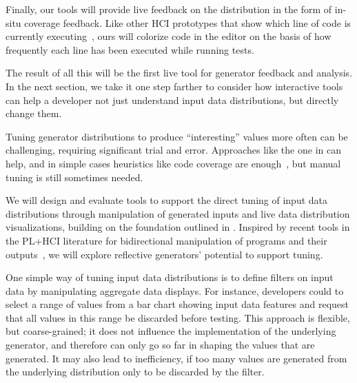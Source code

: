 Finally, our tools will provide live feedback on the
distribution in the form of in-situ coverage feedback. Like other HCI
prototypes that show which line of code is currently
executing~\cite{ref:brandt2010rehearse,
  ref:oney2009firecrystal, ref:burg2013record}, ours will
colorize code in the editor on the basis of
how frequently each line has been executed while running tests.

The result of all this will be the first live tool for generator
feedback and analysis. In the next section, we take it one step
farther to consider how interactive tools can help a developer not
just understand input data distributions, but directly change
them.


%
Tuning generator distributions to produce ``interesting''
values more often can be challenging, requiring
significant trial and error. Approaches
like the one in  can help, and in simple cases
heuristics like code coverage are enough~\cite{afl-readme},
but manual tuning
is still sometimes needed.

We will design and evaluate tools to support the direct tuning of
input data distributions
through manipulation of generated inputs and live data distribution
visualizations, building on the foundation outlined in
. Inspired by recent tools in
the PL+HCI literature
for bidirectional manipulation of programs and their
outputs~\cite{ref:hempel2019sketch, ref:kery2020mage,
  ref:omar2012active, ref:omar2021filling},
we will explore reflective generators' potential to support tuning.

One simple way of tuning input data distributions is to
define filters on input data by manipulating aggregate data displays.
For instance, developers could to select a range of values from a bar
chart showing input data features and request that all values in
this range be discarded before testing. This approach is flexible,
but coarse-grained;
it does not influence the implementation of the underlying generator, and
therefore can only go so far in shaping the values that are
generated.  It may also lead to inefficiency, if too many values are
generated from the underlying distribution only to be discarded by the
filter.

